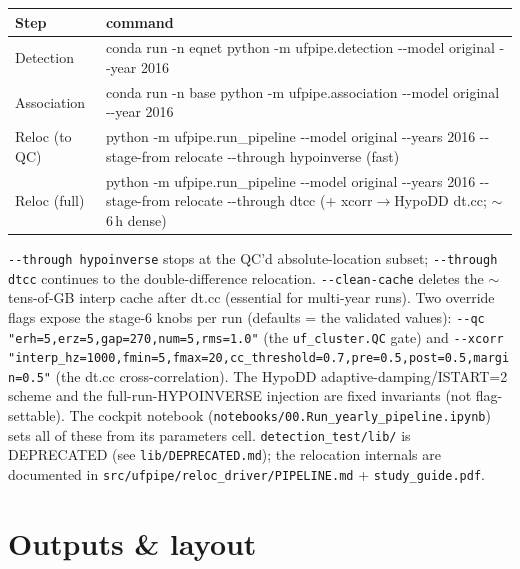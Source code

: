 \documentclass[11pt]{article}
\newcommand{\code}[1]{\texttt{#1}}
\begin{document}
\begin{center}
\small
\begin{tabular}{@{}>{\raggedright\arraybackslash}p{2.9cm}>{\ttfamily\raggedright\arraybackslash}p{11.5cm}@{}}
\toprule
Step & \normalfont command \\
\midrule
Detection & conda run -n eqnet python -m ufpipe.detection -{}-model original -{}-year 2016 \\
Association & conda run -n base python -m ufpipe.association -{}-model original -{}-year 2016 \\
Reloc (to QC) & python -m ufpipe.run\_pipeline -{}-model original -{}-years 2016 -{}-stage-from relocate -{}-through hypoinverse \quad\normalfont(fast) \\
Reloc (full) & python -m ufpipe.run\_pipeline -{}-model original -{}-years 2016 -{}-stage-from relocate -{}-through dtcc \quad\normalfont(+ xcorr$\rightarrow$HypoDD dt.cc; $\sim$6\,h dense) \\
\bottomrule
\end{tabular}
\end{center}
\code{-{}-through hypoinverse} stops at the QC'd absolute-location subset; \code{-{}-through dtcc} continues to the
double-difference relocation. \code{-{}-clean-cache} deletes the $\sim$tens-of-GB interp cache after dt.cc
(essential for multi-year runs). Two override flags expose the stage-6 knobs per run (defaults = the
validated values): \code{-{}-qc "erh=5,erz=5,gap=270,num=5,rms=1.0"} (the \code{uf\_cluster.QC} gate) and
\code{-{}-xcorr "interp\_hz=1000,fmin=5,fmax=20,cc\_threshold=0.7,pre=0.5,post=0.5,margin=0.5"} (the dt.cc
cross-correlation). The HypoDD adaptive-damping/ISTART=2 scheme and the full-run-HYPOINVERSE injection are
fixed invariants (not flag-settable). The cockpit notebook (\code{notebooks/00.Run\_yearly\_pipeline.ipynb})
sets all of these from its parameters cell. \code{detection\_test/lib/} is DEPRECATED (see
\code{lib/DEPRECATED.md}); the relocation internals are documented in
\code{src/ufpipe/reloc\_driver/PIPELINE.md} + \code{study\_guide.pdf}.

\section{Outputs \& layout}
\end{document}
